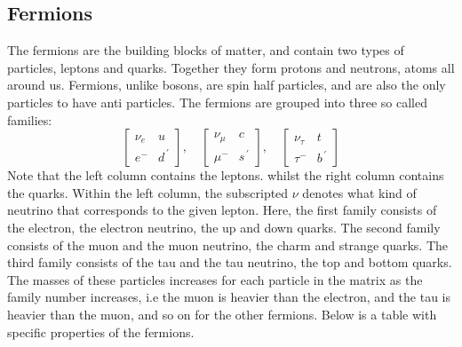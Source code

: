 \subsection*{Fermions}
The fermions are the building blocks of matter, and contain two types of particles, leptons and quarks. Together they form protons and neutrons,  atoms all around us.
Fermions, unlike bosons, are spin half particles, and are also the only particles to have anti particles. The fermions are grouped into three so called families:
\begin{equation*}
    \begin{bmatrix}
        \nu_e & u \\
        e^{-} & d^{\, '} 
    \end{bmatrix},\quad
    \begin{bmatrix}
        \nu_{\mu} & c \\
        \mu^{-} & s^{\, '}
    \end{bmatrix},\quad
    \begin{bmatrix}
        \nu_{\tau} & t \\
        \tau^{-} & b^{\, '}
    \end{bmatrix}
\end{equation*}
Note that the left column contains the leptons. whilst the right column contains the quarks. Within the left column, the subscripted $\nu$ denotes what kind of neutrino that corresponds 
to the given lepton. Here, the first family consists of the electron, the electron neutrino, the up and down quarks. The second family consists of the muon and the
muon neutrino, the charm and strange quarks. The third family consists of the tau and the tau neutrino, the top and bottom quarks. The masses of these particles 
increases for each particle in the matrix as the family number increases, i.e the muon is heavier than the electron, and the tau is heavier than the muon, and so 
on for the other fermions. Below is a table with specific properties of the fermions.\par

